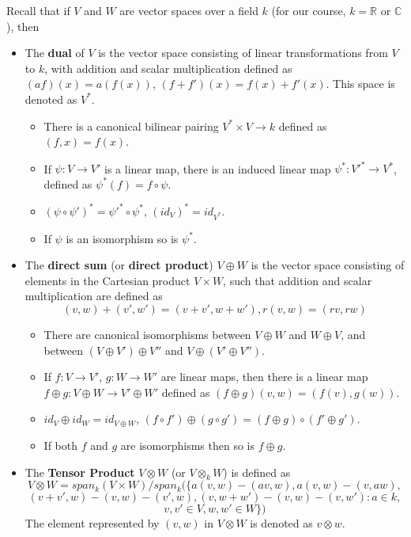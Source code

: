 \documentclass{article}
\theoremstyle{definition}
\begin{document}
Recall that if $V$ and $W$ are vector spaces over a field $k$ (for our course, $k=\mathbb{R}$ or $\mathbb{C}$), then
\begin{itemize}
    \item The {\bf dual} of $V$ is the vector space consisting of linear transformations from $V$ to $k$, with addition and scalar multiplication defined as $(af)(x)=a(f(x))$, $(f+f')(x)=f(x)+f'(x)$. This space is denoted as $V^*$.  
    \begin{itemize}
        \item There is a canonical bilinear pairing $V^*\times V\rightarrow k$ defined as $(f, x)=f(x)$.
        \item If $\psi: V\rightarrow V'$ is a linear map, there is an induced linear map $\psi^*: V'^*\rightarrow V^*$, defined as $\psi^*(f)=f\circ \psi$. 
        \item $(\psi\circ \psi')^*=\psi'^*\circ \psi^*$, $(id_V)^*=id_{V^*}$.
        \item If $\psi$ is an isomorphism so is $\psi^*$.
    \end{itemize}
    \item The {\bf direct sum} (or {\bf direct product}) $V\oplus W$ is the vector space consisting of elements in the Cartesian product $V\times W$, such that addition and scalar multiplication are defined as
    \[(v, w)+(v', w')=(v+v', w+w'), r(v, w)=(rv, rw)\]
    \begin{itemize}
        \item There are canonical isomorphisms between $V\oplus W$ and $W\oplus V$, and between $(V\oplus V')\oplus V''$ and $V\oplus(V'\oplus V'')$.
        \item If $f: V\rightarrow V'$, $g: W\rightarrow W'$ are linear maps, then there is a linear map $f\oplus g: V\oplus W\rightarrow V'\oplus W'$ defined as $(f\oplus g)(v, w)=(f(v), g(w))$. 
        \item $id_V\oplus id_W=id_{V\oplus W}$, $(f\circ f')\oplus (g\circ g')=(f\oplus g)\circ (f'\oplus g')$.
        \item If both $f$ and $g$ are isomorphisms then so is $f\oplus g$.
    \end{itemize}
    \item The {\bf Tensor Product} $V\otimes W$ (or $V\otimes_kW$) is defined as
    \[V\otimes W=span_k(V\times W)/span_k(\{a(v, w)-(av, w), a(v, w)-(v, aw),\]
    \[(v+v', w)-(v, w)-(v', w), (v, w+w')-(v, w)-(v, w'):a\in k, \]
    \[v, v'\in V, w, w'\in W\})\]
    The element represented by $(v, w)$ in $V\otimes W$ is denoted as $v\otimes w$.

\end{itemize}
\end{document}
